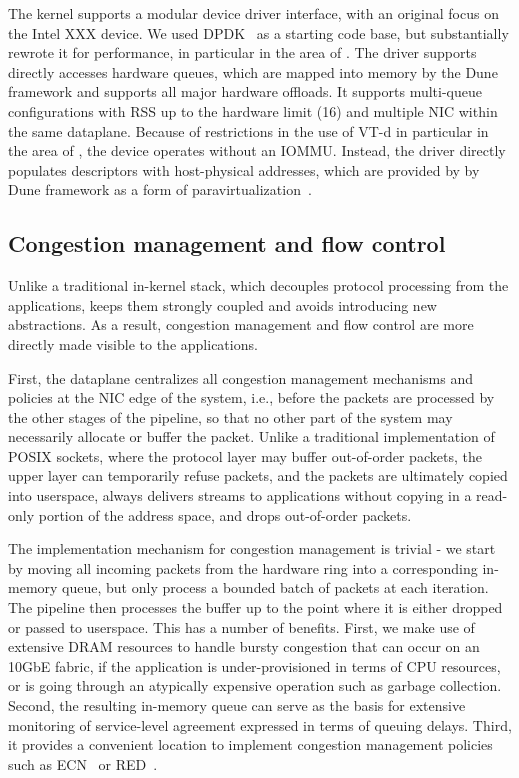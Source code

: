 The \ix kernel supports a modular device driver interface, with an
original focus on the Intel XXX device.  We used
DPDK~\cite{intel:dpdk} as a starting code base, but substantially
rewrote it for performance, in particular in the area of
.  The driver supports directly accesses hardware
queues, which are mapped into memory by the Dune framework and
supports all major hardware offloads.  It supports multi-queue
configurations with RSS up to the hardware limit (16) and multiple NIC
within the same dataplane.  Because of restrictions in the use of VT-d
in particular in the area of , the device operates without
an IOMMU.  Instead, the driver directly populates descriptors with
host-physical addresses, which are provided by by Dune framework as a
form of paravirtualization~\cite{DBLP:conf/sosp/BarhamDFHHHN03}.



\subsection{Congestion management and flow control}
\label{sec:impl:net}

Unlike a traditional in-kernel stack, which decouples protocol
processing from the applications, \ix keeps them strongly coupled and
avoids introducing new abstractions.  As a result, congestion
management and flow control are more directly made visible to the
applications.

First, the \ix dataplane centralizes all congestion management
mechanisms and policies at the NIC edge of the system, i.e., before
the packets are processed by the other stages of the pipeline, so that
no other part of the system may necessarily allocate or buffer the
packet.  Unlike a traditional implementation of POSIX sockets, where
the protocol layer may buffer out-of-order packets, the upper layer
can temporarily refuse packets, and the packets are ultimately copied
into userspace, \ix always delivers streams to applications without
copying in a read-only portion of the address space, and drops
out-of-order packets.

The implementation mechanism for congestion management is trivial - we
start by moving all incoming packets from the hardware ring into a
corresponding in-memory queue, but only process a bounded batch of
packets at each iteration.  The pipeline then processes the buffer up
to the point where it is either dropped or passed to userspace.  This
has a number of benefits.  First, we make use of extensive DRAM
resources to handle bursty congestion that can occur on an 10GbE
fabric, if the application is under-provisioned in terms of CPU
resources, or is going through an atypically expensive operation such
as garbage collection.  Second, the resulting in-memory queue can
serve as the basis for extensive monitoring of service-level agreement
expressed in terms of queuing delays.  Third, it provides a convenient
location to implement congestion management policies such as
ECN~\cite{ramakrishnan2001addition} or
RED~\cite{DBLP:journals/ton/FloydJ93}.

